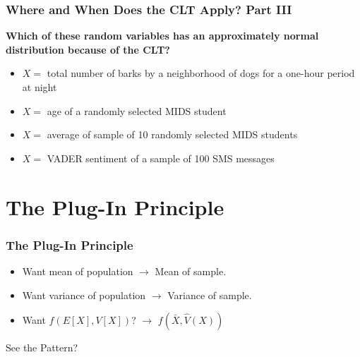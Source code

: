 \documentclass[12pt, block=fill]{beamer}
\begin{document}
\begin{frame}[t]
  \frametitle{Where and When Does the CLT Apply? Part III} 
  
  \textbf{Which of these random variables has an approximately normal distribution because of the CLT?}
  \begin{itemize}
  \item $X=$ total number of barks by a neighborhood of dogs
    for a one-hour period at night
  \item $X=$ age of a randomly selected MIDS student
  \item $X=$ average of sample of 10 randomly selected
    MIDS students
  \item$X=$ VADER sentiment of a sample of 100 SMS
    messages
  \end{itemize}
\end{frame}

\section{The Plug-In Principle}

\begin{frame}
  \frametitle{The Plug-In Principle}
  
  


  \begin{itemize}
  
  \item Want mean of population $\rightarrow$ Mean of sample.
  \item Want variance of population $\rightarrow$ Variance of sample.
  \item Want $f(E[X], V[X])$? $\rightarrow$ $f(\bar X, \hat V(X))$
  \end{itemize}
  \center   See the Pattern?
\end{frame}
\end{document}
